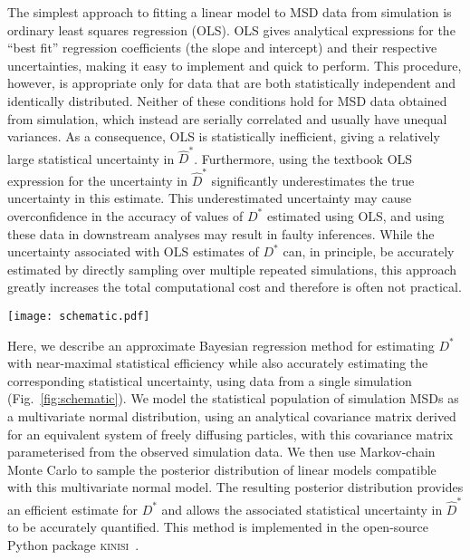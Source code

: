 \documentclass[reprint,superscriptaddress,nobibnotes,amsmath,amssymb,aps,prx,hidelinks,linenumbers]{revtex4-2}
\newcommand{\Dest}{\ensuremath{\widehat{D}^*}}
\newcommand{\D}{\ensuremath{D^*}}
\begin{document}
The simplest approach to fitting a linear model to MSD data from simulation is ordinary least squares regression (OLS).
OLS gives analytical expressions for the ``best fit'' regression coefficients (the slope and intercept) and their respective uncertainties, making it easy to implement and quick to perform.
This procedure, however, is appropriate only for data that are both statistically independent and identically distributed.
Neither of these conditions hold for MSD data obtained from simulation, which instead are serially correlated and usually have unequal variances.
As a consequence, OLS is statistically inefficient, giving a relatively large statistical uncertainty in $\Dest$.
Furthermore, using the textbook OLS expression for the uncertainty in $\Dest$ significantly underestimates the true uncertainty in this estimate.
This underestimated uncertainty may cause overconfidence in the accuracy of values of $\D$ estimated using OLS, and using these data in downstream analyses may result in faulty inferences.
While the uncertainty associated with OLS estimates of $\D$ can, in principle, be accurately estimated by directly sampling over multiple repeated simulations, this approach greatly increases the total computational cost and therefore is often not practical.

\begin{figure*}
    \centering
    \texttt{[image: schematic.pdf]}
    \caption{
        A schematic diagram of the Bayesian regression method described in this work, running from our simulations through the sampling of displacement, variance and covariance estimation and final the sampling process to give the marginal posterior distribution for $\D$.}
    \label{fig:schematic}
\end{figure*}

Here, we describe an approximate Bayesian regression method for estimating $\D$ with near-maximal statistical efficiency while also accurately estimating the corresponding statistical uncertainty, using data from a single simulation (Fig.~\ref{fig:schematic}).
We model the statistical population of simulation MSDs as a multivariate normal distribution, using an analytical covariance matrix derived for an equivalent system of freely diffusing particles, with this covariance matrix parameterised from the observed simulation data.
We then use Markov-chain Monte Carlo to sample the posterior distribution of linear models compatible with this multivariate normal model.
The resulting posterior distribution provides an efficient estimate for $\D$ and allows the associated statistical uncertainty in $\Dest$ to be accurately quantified.
This method is implemented in the open-source Python package \textsc{kinisi}~\cite{mccluskey_kinisi_2022}.
\end{document}
